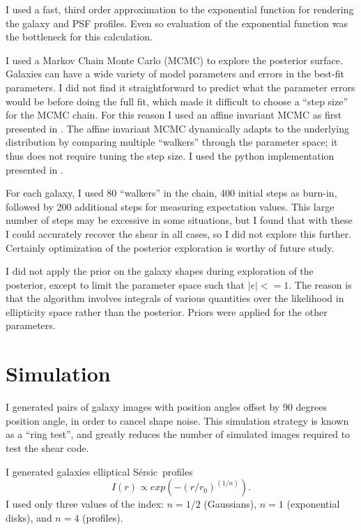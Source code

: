 \documentclass[12pt,preprint]{aastex}
\newcommand{\sersic}{S\'{e}rsic}
\begin{document}
I used a fast, third order approximation to the exponential function for
rendering the galaxy and PSF profiles.  Even so evaluation of the exponential
function was the bottleneck for this calculation.

I used a Markov Chain Monte Carlo (MCMC) to explore the posterior surface.
Galaxies can have a wide variety of model parameters and errors in the best-fit
parameters.  I did not find it straightforward to predict what the parameter
errors would be before doing the full fit, which made it difficult to choose a
``step size'' for the MCMC chain.  For this reason I used an affine invariant
MCMC as first presented in \citet{GoodmanWeare10}.  The affine invariant MCMC
dynamically adapts to the underlying distribution by comparing multiple
``walkers'' through the parameter space; it thus does not require tuning the
step size.  I used the python implementation presented in \citet{Mackey13}.

For each galaxy, I used 80 ``walkers'' in the chain, 400 initial steps as
burn-in, followed by 200 additional steps for measuring expectation values.
This large number of steps may be excessive in some situations, but I found
that with these I could accurately recover the shear in all cases, so I did not
explore this further.  Certainly optimization of the posterior exploration is
worthy of future study.

I did not apply the prior on the galaxy shapes during exploration of the
posterior, except to limit the parameter space such that $|e| <= 1$. The reason
is that the algorithm involves integrals of various quantities over the
likelihood in ellipticity space rather than the posterior.  Priors were applied
for the other parameters.


\section{Simulation} \label{sec:sim}

I generated pairs of galaxy images with position angles offset by 90 degrees
position angle, in order to cancel shape noise.  This simulation strategy is
known as a ``ring test''\citep{Nakajima2007}, and greatly reduces the number of
simulated images required to test the shear code.

I generated galaxies elliptical \sersic\ profiles \citep{Sersic63}
\begin{equation}
I(r) \varpropto exp(-(r/r_0)^(1/n)).
\end{equation}
I used only three values of the index: $n=1/2$ (Gaussians), $n=1$ (exponential
disks), and $n=4$ (\dev profiles).
\end{document}
